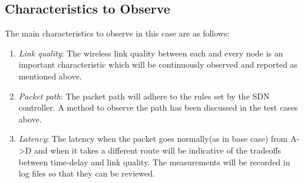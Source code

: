 \documentclass{article}
\begin{document}
\subsection{Characteristics to Observe}
The main characteristics to observe in this case are as follows:
\begin{enumerate}
\item \textit{Link quality}: The wireless link quality between each and every node is an important characteristic which will be
continuously observed and reported as mentioned above. 
\item \textit{Packet path}: The packet path will adhere to the rules set by the SDN controller. A method to observe the path has
been discussed in the test cases above. 
\item \textit{Latency}: The latency when the packet goes normally(as in base case) from A-\textgreater D and when it takes a different route
will be indicative of the tradeoffs between time-delay and link quality. The measurements will be recorded in log files
so that they can be reviewed.
\end{enumerate}
\end{document}
